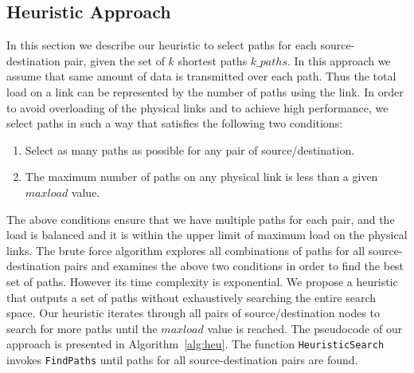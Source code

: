 \subsection{Heuristic Approach}
\label{sec:heuristic}

In this section we describe our heuristic to select paths for each source-destination pair, given the set of $k$ shortest paths $k\_paths$. In this approach we assume that same amount of data is transmitted over each path. Thus the total load on a link can be represented by the number of paths using the link. In order to avoid overloading of the physical links and to achieve high performance, we select paths in such a way that satisfies the following two conditions:
\begin{enumerate}
\item Select as many paths as possible for any pair of source/destination. 
\item The maximum number of paths on any physical link is less than a given $maxload$ value.
\end{enumerate}
The above conditions ensure that we have multiple paths for each pair, and the load is balanced and it is within the upper limit of maximum load on the physical links. The brute force algorithm explores all combinations of paths for all source-destination pairs and examines the above two conditions in order to find the best set of paths. However its time complexity is exponential. We propose a heuristic that outputs a set of paths without exhaustively searching the entire search space. Our heuristic iterates through all pairs of source/destination nodes to search for more paths until the $maxload$ value is reached. The pseudocode of our approach is presented in Algorithm~\ref{alg:heu}. The function \texttt{HeuristicSearch} invokes \texttt{FindPaths} until paths for all source-destination pairs are found. 
 

